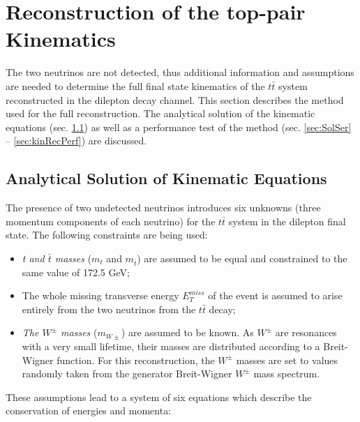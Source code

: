 \chapter{Reconstruction of the top-pair Kinematics}\label{chapt:kinReco}

The two neutrinos are not detected, thus additional information and
assumptions are needed to determine the full final state kinematics of the $t\bar{t}$ system reconstructed in the dilepton decay channel.
This section describes the method used for the full reconstruction. The analytical solution of the
kinematic equations (sec. \ref{sec:MatBg}) as well as a performance test of the method 
(sec. \ref{sec:SolSer} -- \ref{sec:kinRecPerf}) are discussed.

\section{Analytical Solution of Kinematic Equations}\label{sec:MatBg}

The presence of two undetected neutrinos introduces six unknowns  (three momentum components of each neutrino)
for the $t\bar{t}$ system in the dilepton final state.
The following constraints are being used:

\begin{itemize}
 \item \textit{t and $\bar{t}$ masses} ($m_{t}$ and $m_ {\bar{t}}$) are assumed to be equal and constrained to the same value of 172.5 GeV\cite{PDG-2012};
 \item The whole missing transverse energy $E_{T}^{miss}$ of the event is assumed to arise entirely
 from the two neutrinos from the $t\bar{t}$ decay;
 \item \textit{The $W^{\pm}$ masses} ($m_{W\pm}$) are assumed to be known. As $W^{\pm}$ are resonances with a very small lifetime, their masses 
 are distributed according to a Breit-Wigner function. For this reconstruction, the $W^{\pm}$ masses are set to values randomly taken 
 from the generator Breit-Wigner $W^{\pm}$ mass spectrum.
\end{itemize}

These assumptions lead to a system of six equations which describe the conservation of energies and momenta:

